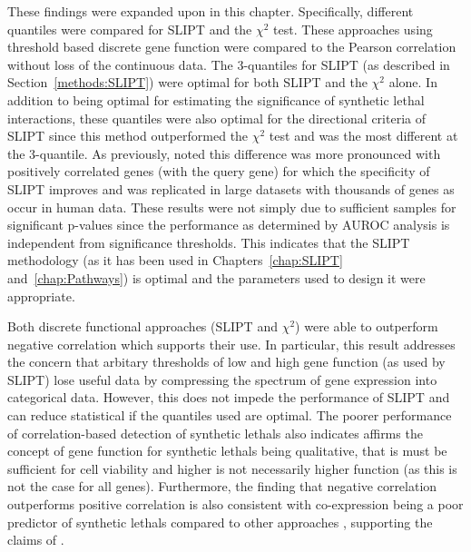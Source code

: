 These findings were expanded upon in this chapter. Specifically, different quantiles were compared for \gls{SLIPT} and the $\chi^2$ test. These approaches using threshold based discrete gene function were compared to the Pearson correlation without loss of the continuous  data. The 3-quantiles for \gls{SLIPT} (as described in Section~\ref{methods:SLIPT}) were optimal for both \gls{SLIPT} and the $\chi^2$ alone. In addition to being optimal for estimating the significance of \gls{synthetic lethal} interactions, these quantiles were also optimal for the directional criteria of \gls{SLIPT} since this method outperformed the $\chi^2$ test and was the most different at the 3-quantile. As previously, noted this difference was more pronounced with positively correlated genes (with the query gene) for which the specificity of \gls{SLIPT} improves and was replicated in large datasets with thousands of genes as occur in human  data. These results were not simply due to sufficient samples for significant p-values since the performance as determined by \gls{AUROC} analysis is independent from significance thresholds. This indicates that the \gls{SLIPT} methodology (as it has been used in Chapters~\ref{chap:SLIPT} and~\ref{chap:Pathways}) is optimal and the parameters used to design it were appropriate.

Both discrete functional approaches (\gls{SLIPT} and $\chi^2$) were able to outperform negative correlation which supports their use. In particular, this result addresses the concern that arbitary thresholds of low and high gene function (as used by \gls{SLIPT}) lose useful data by compressing the spectrum of \gls{gene expression} into categorical data. However, this does not impede the performance of \gls{SLIPT} and can reduce statistical if the quantiles used are optimal. The poorer performance of correlation-based detection of \glspl{synthetic lethal} also indicates affirms the concept of gene function for \glspl{synthetic lethal} being qualitative, that is  must be sufficient for cell viability and higher  is not necessarily higher function (as this is not the case for all genes). Furthermore, the finding that negative correlation outperforms positive correlation is also consistent with co-expression being a poor predictor of \glspl{synthetic lethal} compared to other approaches \citep{Jerby2014}, supporting the claims of \citet{Lu2015}.

